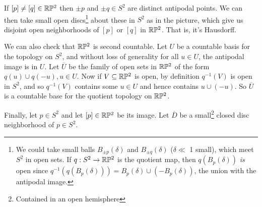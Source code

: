\documentclass[a4paper]{scrartcl}
\begin{document}
\begin{example}
\begin{center}
        
            \end{center}
        

    If $[p] \neq [q] \in \mathbb{R}\mathbb{P}^2$ then $\pm p$ and $\pm q \in S^2$ are distinct antipodal points. We can then take small open discs\footnote{We could take small balls $B_{\pm p}(\delta)$ and $B_{\pm q}(\delta)$ ($\delta \ll$ 1 small), which meet $S^2$ in open sets. If $q: S^2 \rightarrow \mathbb{R}\mathbb{P}^2$ is the quotient map, then $q(B_{p}(\delta))$ \emph{is} open since $q^{-1}(q(B_{p}(\delta))) = B_{p}(\delta) \cup (-B_{p}(\delta))$, the union with the antipodal image.} about these in $S^2$ as in the picture, which give us disjoint open neighborhoods of $[p]$ or $[q]$ in $\mathbb{R} \mathbb{P}^2$. That is, it's Hausdorff.

    We can also check that $\mathbb{R}\mathbb{P}^2$ is second countable. Let $U$ be a countable basis for the topology on $S^2$, and without loss of generality for all $u \in U$, the antipodal image is in $U$.
    Let $\overline{U}$ be the family of open sets in $\mathbb{R}\mathbb{P}^2$ of the form $q(u) \cup q(-u), u \in U$.
    Now if $V \subseteq \mathbb{R}\mathbb{P}^2$ is open, by definition $q^{-1}(V)$ is open in $S^2$, and so $q^{-1}(V)$ contains some $u \in U$ and hence contains $u \cup (-u)$. So $\overline{U}$ is a countable base for the quotient topology on $\mathbb{R}\mathbb{P}^2$.

    Finally, let $p \in S^2$ and let $[p] \in \mathbb{R}\mathbb{P}^2$ be its image.
    Let $\overline{D}$ be a small\footnote{Contained in an open hemisphere} closed disc neighborhood of $p \in S^2$.

    \begin{center}
        

  


\end{center}
\end{example}
\end{document}
